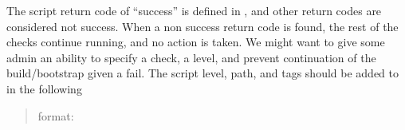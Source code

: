 \documentclass[letterpaper,10pt,english]{sphinxmanual}
\begin{document}
 The script return code of “success” is defined in
, and other return
codes are considered not success. When a non success return code is
found, the rest of the checks continue running, and no action is
taken. We might want to give some admin an ability to specify a check,
a level, and prevent continuation of the build/bootstrap given a fail.
 The script level, path, and tags should be added to
 in the following
\begin{quote}

format:
\end{quote}
\end{document}
